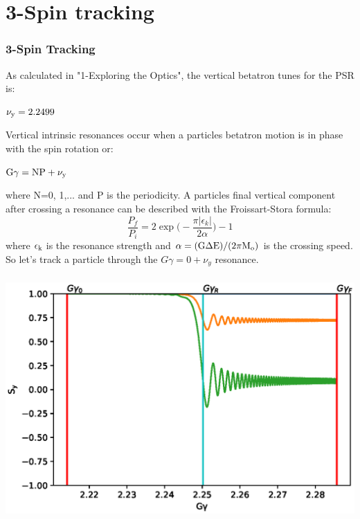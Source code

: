 \documentclass{beamer}
\begin{document}
\section{3-Spin tracking}
\begin{frame}
\frametitle{3-Spin Tracking}
\begin{minipage}{1.0\textwidth}
\small
As calculated in "1-Exploring the Optics", the vertical betatron tunes  for the PSR is:
\vspace{-0.2em}
\begin{center}
$\rm\nu_y=2.2499$
\end{center}
\vspace{-0.2em}
Vertical intrinsic resonances occur when a particles betatron motion is in phase with the spin rotation or:
\vspace{-0.2em}
\begin{center}
$\rm G\gamma=NP+\nu_y$
\end{center}
\vspace{-0.2em}
where N=0, 1,... and P is the periodicity. A particles final vertical component after crossing a resonance can be described with the Froissart-Stora formula:
\begin{equation}
\frac{P_f}{P_i}=2\exp\bigg(-\frac{\pi|\epsilon_k|}{2\alpha}\bigg)-1
\end{equation}
where $\rm\epsilon_k$ is the resonance strength and $\rm \alpha=(G\Delta E)/(2\pi M_o)$ is the crossing speed.\\
So let's track a particle through the $G\gamma=0+\nu_y$ resonance.
\end{minipage}
\end{frame}
\begin{frame}
\frametitle{}
\includegraphics[width=1.0\linewidth]{PSR_FStora.eps}
\end{frame}
\end{document}
